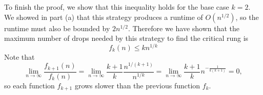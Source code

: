 \documentclass[12 pt, oneside]{article}
\begin{document}
\begin{enumerate}
\begin{enumerate}
\begin{equation*}
\end{equation*}
To finish the proof, we show that this inequality holds for the base case $k = 2$. We showed in part (a) that this strategy produces a runtime of $O(n^{1/2})$, so the runtime must also be bounded by $2n^{1/2}$. Therefore we have shown that the maximum number of drops needed by this strategy to find the critical rung is 
$$ f_k(n) \le kn^{1/k} $$
Note that 
$$ \lim_{n \rightarrow \infty} \frac{f_{k+1}(n)}{f_k(n)} = \lim_{n \rightarrow \infty} \frac{k+1}{k} \frac{n^{1/(k+1)}}{n^{1/k}} = \lim_{n \rightarrow \infty} \frac{k+1}{k} n^{-\frac{1}{k(k+1)}} = 0,$$
so each function $f_{k+1}$ grows slower than the previous function $f_k$.
\end{enumerate}
\end{enumerate}
\end{document}
